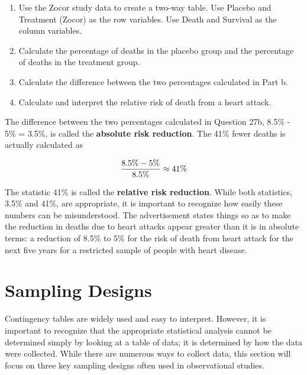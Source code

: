 \documentclass[
]{book}
\providecommand{\tightlist}{%
  \setlength{\itemsep}{0pt}\setlength{\parskip}{0pt}}
\begin{document}
\begin{enumerate}
\def\labelenumi{\alph{enumi}.}
\tightlist
\item
  Use the Zocor study data to create a two-way table. Use Placebo and Treatment (Zocor) as the row variables. Use Death and Survival as the column variables.\\
\item
  Calculate the percentage of deaths in the placebo group and the percentage of deaths in the treatment group.\\
\item
  Calculate the difference between the two percentages calculated in Part b.\\
\item
  Calculate and interpret the relative risk of death from a heart attack.
\end{enumerate}

The difference between the two percentages calculated in Question 27b, 8.5\% - 5\% = 3.5\%, is called the \textbf{absolute risk reduction}. The 41\% fewer deaths is actually calculated as

\begin{align}
\frac{8.5\% - 5\%}{8.5\%} \approx 41\% 
\notag
\end{align}

The statistic 41\% is called the \textbf{relative risk reduction}. While both statistics, 3.5\% and 41\%, are appropriate, it is important to recognize how easily these numbers can be misunderstood. The advertisement states things so as to make the reduction in deaths due to heart attacks appear greater than it is in absolute terms: a reduction of 8.5\% to 5\% for the risk of death from heart attack for the next five years for a restricted sample of people with heart disease.

\hypertarget{sampling-designs}{%
\section{Sampling Designs}\label{sampling-designs}}

Contingency tables are widely used and easy to interpret. However, it is important to recognize that the appropriate statistical analysis cannot be determined simply by looking at a table of data; it is determined by how the data were collected. While there are numerous ways to collect data, this section will focus on three key sampling designs often used in observational studies.
\end{document}
